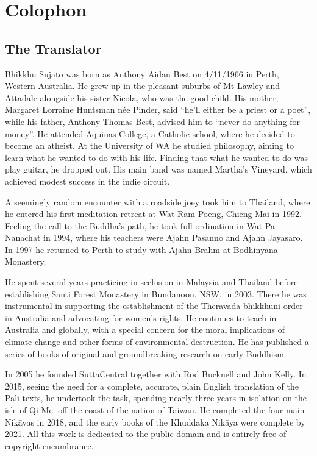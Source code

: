 \documentclass[12pt,openany]{book}%
\let\oldbackmatter\backmatter
\renewcommand{\backmatter}{%
\chapterfont{\setstretch{.85}\normalfont\centering}%
\sectionfont{\setstretch{.85}\normalfont\BalancedRagged}%
\pagestyle{plainer}%
\oldbackmatter}
\begin{document}
%
\backmatter%
%
\chapter*{Colophon}

\section*{The Translator}

Bhikkhu Sujato was born as Anthony Aidan Best on 4/11/1966 in Perth, Western Australia. He grew up in the pleasant suburbs of Mt Lawley and Attadale alongside his sister Nicola, who was the good child. His mother, Margaret Lorraine Huntsman née Pinder, said “he’ll either be a priest or a poet”, while his father, Anthony Thomas Best, advised him to “never do anything for money”. He attended Aquinas College, a Catholic school, where he decided to become an atheist. At the University of WA he studied philosophy, aiming to learn what he wanted to do with his life. Finding that what he wanted to do was play guitar, he dropped out. His main band was named Martha’s Vineyard, which achieved modest success in the indie circuit. 

A seemingly random encounter with a roadside joey took him to Thailand, where he entered his first meditation retreat at Wat Ram Poeng, Chieng Mai in 1992. Feeling the call to the Buddha’s path, he took full ordination in Wat Pa Nanachat in 1994, where his teachers were Ajahn Pasanno and Ajahn Jayasaro. In 1997 he returned to Perth to study with Ajahn Brahm at Bodhinyana Monastery. 

He spent several years practicing in seclusion in Malaysia and Thailand before establishing Santi Forest Monastery in Bundanoon, NSW, in 2003. There he was instrumental in supporting the establishment of the Theravada bhikkhuni order in Australia and advocating for women’s rights. He continues to teach in Australia and globally, with a special concern for the moral implications of climate change and other forms of environmental destruction. He has published a series of books of original and groundbreaking research on early Buddhism. 

In 2005 he founded SuttaCentral together with Rod Bucknell and John Kelly. In 2015, seeing the need for a complete, accurate, plain English translation of the Pali texts, he undertook the task, spending nearly three years in isolation on the isle of Qi Mei off the coast of the nation of Taiwan. He completed the four main \textsanskrit{Nikāyas} in 2018, and the early books of the Khuddaka \textsanskrit{Nikāya} were complete by 2021. All this work is dedicated to the public domain and is entirely free of copyright encumbrance. 
\end{document}
